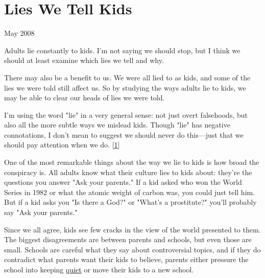 \chapter{Lies We Tell Kids}


            
              
                

May 2008

Adults lie constantly to kids. I'm not
                  saying we should stop, but I think we should at least examine
                  which lies we tell and why.

There may also be a
                  benefit to us. We were all lied to as kids, and some of the
                  lies we were told still affect us. So by studying the ways
                  adults lie to kids, we may be able to clear our heads of lies
                  we were told.

I'm using the word "lie" in a very
                  general sense: not just overt falsehoods, but also all the
                  more subtle ways we mislead kids. Though "lie" has negative
                  connotations, I don't mean to suggest we should never do
                  this---just that we should pay attention when we do.
                  [\href{\#f1n}{1}]

One of the most remarkable things about the way
                  we lie to kids is how broad the conspiracy is. All adults know
                  what their culture lies to kids about: they're the questions
                  you answer "Ask your parents." If a kid asked who won the
                  World Series in 1982 or what the atomic weight of carbon was,
                  you could just tell him. But if a kid asks you "Is there a
                  God?" or "What's a prostitute?" you'll probably say "Ask your
                  parents."

Since we all agree, kids see few cracks
                  in the view of the world presented to them. The biggest
                  disagreements are between parents and schools, but even those
                  are small. Schools are careful what they say about
                  controversial topics, and if they do contradict what parents
                  want their kids to believe, parents either pressure the school
                  into keeping
                  \href{http://www.google.com/search?q=parents+complain+inappropriate+book}{quiet}
                  or move their kids to a new school.

